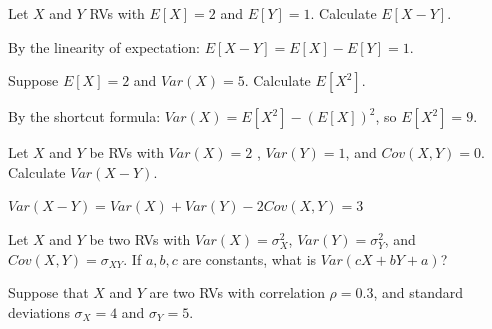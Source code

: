 \documentclass[addpoints,12pt]{exam}
\begin{document}
\begin{questions}
\question Let $X$ and $Y$ RVs with $E[X] = 2$ and $E[Y] = 1$. Calculate $E[X - Y]$.
\begin{solution}
  By the linearity of expectation: $E[X - Y] = E[X] - E[Y] = 1$. 
\end{solution}

\question Suppose $E[X] = 2$ and $Var(X) = 5$. Calculate $E[X^2]$.
\begin{solution}
  By the shortcut formula: $Var(X) = E[X^2] - \left( E[X] \right)^2$, so $E[X^2] = 9$.
\end{solution}

\question Let $X$ and $Y$ be RVs with $Var(X) = 2$ , $Var(Y) = 1$, and $Cov(X,Y) = 0$. Calculate $Var(X - Y)$.
\begin{solution}
  $Var(X - Y) = Var(X) + Var(Y) - 2 Cov(X,Y) = 3$
\end{solution}

\question Let $X$ and $Y$ be two RVs with $Var(X) = \sigma_X^2$, $Var(Y) = \sigma_Y^2$, and $Cov(X,Y) = \sigma_{XY}$. If $a,b,c$ are constants, what is $Var(cX + bY + a)$?

\question Suppose that $X$ and $Y$ are two RVs with correlation $\rho = 0.3$, and standard deviations $\sigma_X = 4$ and $\sigma_Y = 5$.


\end{questions}
\end{document}

